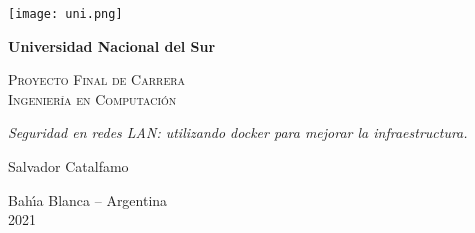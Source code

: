 \begin{titlepage}

\begin{center}
\texttt{[image: uni.png]}
\end{center}

\begin{center}

\textbf{\LARGE Universidad Nacional del Sur}\\

\vspace{2cm}

\textsc{\LARGE Proyecto Final de Carrera}\\ \vspace{.1cm}
\textsc{\LARGE Ingenier\'ia en Computaci\'on}\\


\vspace{4cm}

\emph{\LARGE Seguridad en redes LAN: utilizando docker para mejorar la infraestructura.}\\

\vspace{2.5cm}

{\Large Salvador Catalfamo}\\

\vspace{2.5cm}

{\sc\Large Bah\'{\i}a Blanca -- Argentina}\\
\vspace*{.1cm} {\Large 2021}

\end{center}
\end{titlepage}
